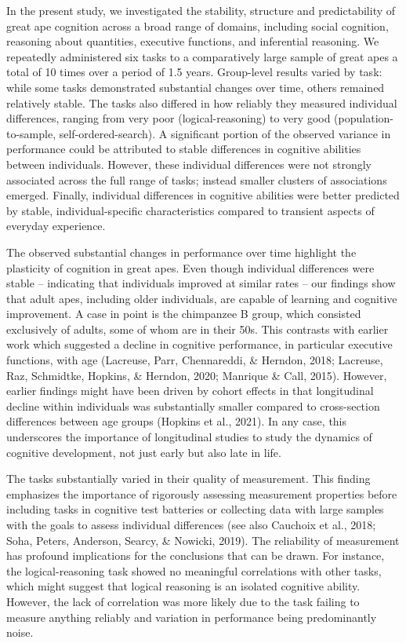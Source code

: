 \documentclass[
  man,floatsintext]{apa6}
\begin{document}
In the present study, we investigated the stability, structure and predictability of great ape cognition across a broad range of domains, including social cognition, reasoning about quantities, executive functions, and inferential reasoning. We repeatedly administered six tasks to a comparatively large sample of great apes a total of 10 times over a period of 1.5 years. Group-level results varied by task: while some tasks demonstrated substantial changes over time, others remained relatively stable. The tasks also differed in how reliably they measured individual differences, ranging from very poor (logical-reasoning) to very good (population-to-sample, self-ordered-search). A significant portion of the observed variance in performance could be attributed to stable differences in cognitive abilities between individuals. However, these individual differences were not strongly associated across the full range of tasks; instead smaller clusters of associations emerged. Finally, individual differences in cognitive abilities were better predicted by stable, individual-specific characteristics compared to transient aspects of everyday experience.

The observed substantial changes in performance over time highlight the plasticity of cognition in great apes. Even though individual differences were stable -- indicating that individuals improved at similar rates -- our findings show that adult apes, including older individuals, are capable of learning and cognitive improvement. A case in point is the chimpanzee B group, which consisted exclusively of adults, some of whom are in their 50s. This contrasts with earlier work which suggested a decline in cognitive performance, in particular executive functions, with age (Lacreuse, Parr, Chennareddi, \& Herndon, 2018; Lacreuse, Raz, Schmidtke, Hopkins, \& Herndon, 2020; Manrique \& Call, 2015). However, earlier findings might have been driven by cohort effects in that longitudinal decline within individuals was substantially smaller compared to cross-section differences between age groups (Hopkins et al., 2021). In any case, this underscores the importance of longitudinal studies to study the dynamics of cognitive development, not just early but also late in life.

The tasks substantially varied in their quality of measurement. This finding emphasizes the importance of rigorously assessing measurement properties before including tasks in cognitive test batteries or collecting data with large samples with the goals to assess individual differences (see also Cauchoix et al., 2018; Soha, Peters, Anderson, Searcy, \& Nowicki, 2019). The reliability of measurement has profound implications for the conclusions that can be drawn. For instance, the logical-reasoning task showed no meaningful correlations with other tasks, which might suggest that logical reasoning is an isolated cognitive ability. However, the lack of correlation was more likely due to the task failing to measure anything reliably and variation in performance being predominantly noise.
\end{document}

